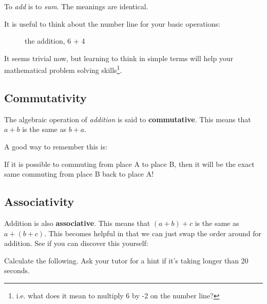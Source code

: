 \begin{student}
To \emph{add} is to \emph{sum}. The meanings are identical.

It is useful to think about the number line for your basic operations:

\begin{figure}[ht]
    \centering
    \caption{the addition, 6 + 4}
\end{figure}

It seems trivial now, but learning to think in simple terms will help your mathematical problem solving skills\footnote{i.e. what does it mean to multiply 6 by -2 on the number line?}.
\end{student}

\subsection{Commutativity}
The algebraic operation of \emph{addition} is said to \textbf{commutative}. This means that $a + b$ is the same as $b + a$.

\begin{questions}
    \Question[1] A good way to remember this is:
    \begin{solutionordottedlines}[1in]
        If it is possible to commuting from place A to place B, then it will be the exact same commuting from place B back to place A!
    \end{solutionordottedlines}
\end{questions}

\subsection{Associativity}
Addition is also \textbf{associative}. This means that $(a + b) + c$ is the same as $a + (b + c)$. This becomes helpful in that we can just swap the order around for addition. See if you can discover this yourself:

\begin{examples}
    \begin{questions}
        \Question[2] Calculate the following. Ask your tutor for a hint if it's taking longer than 20 seconds.
    \end{questions}
\end{examples}

